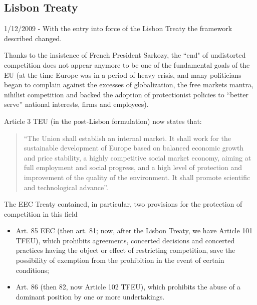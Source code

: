         

    \subsection{Lisbon Treaty}

        1/12/2009 - With the entry into force of the Lisbon Treaty the framework described changed. 

        Thanks to the insistence of French President Sarkozy, the “end" of undistorted competition does not appear anymore to be one of the fundamental goals of the EU (at the time Europe was in a period of heavy crisis, and many politicians began to complain against the excesses of globalization, the free markets mantra, nihilist competition and backed the adoption of protectionist policies to “better serve” national interests, firms and employees). 
    
        Article 3 TEU (in the post-Lisbon formulation) now states that: 
        \begin{quote}
            “The Union shall establish an internal market. It shall work for the sustainable development of Europe based on balanced economic growth and price stability, a highly competitive social market economy, aiming at full employment and social progress, and a high level of protection and improvement of the quality of the environment. It shall promote scientific and technological advance”.
        \end{quote}


        The EEC Treaty contained, in particular, two provisions for the protection of competition in this field 
        \begin{itemize}
            \item Art. 85 EEC (then art. 81; now, after the Lisbon Treaty, we have Article 101 TFEU), which prohibits agreements, concerted decisions and concerted practices having the object or effect of restricting competition, save the possibility of exemption from the prohibition in the event of certain conditions; 
            \item Art. 86 (then 82, now Article 102 TFEU), which prohibits the abuse of a dominant position by one or more undertakings. 
        \end{itemize}

